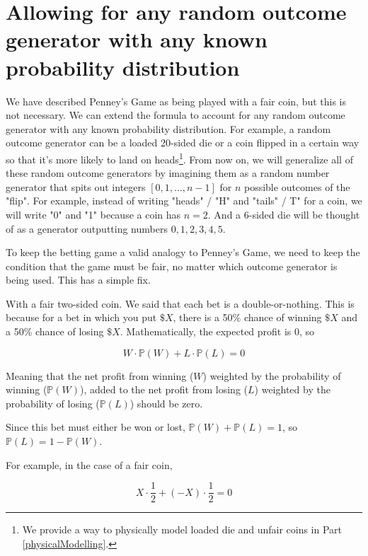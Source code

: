 \documentclass[english,12pt,a4paper,final]{article}
\begin{document}
\section{Allowing for any random outcome generator with any known probability distribution}

We have described Penney's Game as being played with a fair coin, but this is not necessary. We can extend the formula to account for any random outcome generator with any known probability distribution. For example, a random outcome generator can be a loaded 20-sided die or a coin flipped in a certain way so that it's more likely to land on heads\footnote{We provide a way to physically model loaded die and unfair coins in Part \ref{physicalModelling}.}. From now on, we will generalize all of these random outcome generators by imagining them as a random number generator that spits out integers $[0, 1, ..., n-1]$ for $n$ possible outcomes of the "flip". For example, instead of writing "heads" / "H" and "tails" / T" for a coin, we will write "0" and "1" because a coin has $n=2$. And a 6-sided die will be thought of as a generator outputting numbers $0, 1, 2, 3, 4, 5$.

To keep the betting game a valid analogy to Penney's Game, we need to keep the condition that the game must be fair, no matter which outcome generator is being used. This has a simple fix.

With a fair two-sided coin. We said that each bet is a double-or-nothing. This is because for a bet in which you put $\$X$, there is a 50\% chance of winning $\$X$ and a 50\% chance of losing $\$X$. Mathematically, the expected profit is 0, so

\begin{equation*}
	W \cdot \mathbb{P}(W) + L \cdot \mathbb{P}(L)=0
\end{equation*}

Meaning that the net profit from winning ($W$) weighted by the probability of winning ($\mathbb{P}(W)$), added to the net profit from losing ($L$) weighted by the probability of losing ($\mathbb{P}(L)$) should be zero.

Since this bet must either be won or lost, $\mathbb{P}(W) + \mathbb{P}(L) = 1$, so $\mathbb{P}(L) = 1-\mathbb{P}(W)$.

For example, in the case of a fair coin, 

\begin{equation*}
	X \cdot \frac{1}{2} + (-X) \cdot \frac{1}{2}=0
\end{equation*}
\end{document}
